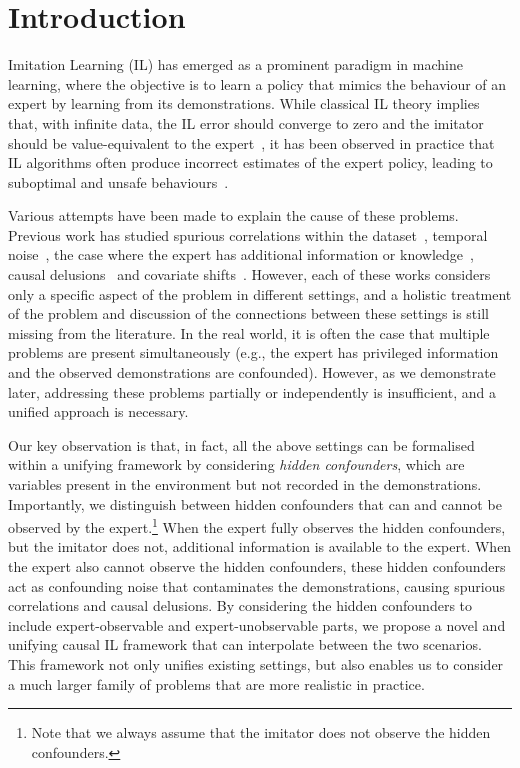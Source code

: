\section{Introduction}\label{sec:intro}
Imitation Learning (IL) has emerged as a prominent paradigm in machine learning, where the objective is to learn a policy that mimics the behaviour of an expert by learning from its demonstrations. While classical IL theory implies that, with infinite data, the IL error should converge to zero and the imitator should be value-equivalent to the expert~\citep{Ross2011,Spencer2021}, it has been observed in practice that IL algorithms often produce incorrect estimates of the expert policy, leading to suboptimal and unsafe behaviours~\citep{Lecun2005,Codevilla2019,Bansal2018,Kuefler2017}. 

Various attempts have been made to explain the cause of these problems. Previous work has studied spurious correlations within the dataset~\citep{deHaan2019,Codevilla2019,Pfrommer2023}, temporal noise~\citep{Swamy2022_temporal}, the case where the expert has additional information or knowledge~\citep{Swamy2022,Vuorio2022,Chen2019,Choudhury2017}, causal delusions~\citep{Ortega2008,Ortega2021} and covariate shifts~\citep{Spencer2021}. 
However, each of these works considers only a specific aspect of the problem in different settings, and a holistic treatment of the problem and discussion of the connections between these settings is still missing from the literature. 
In the real world, it is often the case that multiple problems are present simultaneously (e.g., the expert has privileged information and the observed demonstrations are confounded). However, as we demonstrate later, addressing these problems partially or independently is insufficient, and a unified approach is necessary. 

Our key observation is that, in fact, all the above settings can be formalised within a unifying framework by considering \textit{hidden confounders}, which are variables present in the environment but not recorded in the demonstrations. Importantly, we distinguish between hidden confounders that can and cannot be observed by the expert.\footnote{Note that we always assume that the imitator does not observe the hidden confounders.} 
When the expert fully observes the hidden confounders, but the imitator does not, additional information is available to the expert. When the expert also cannot observe the hidden confounders, these hidden confounders act as confounding noise that contaminates the demonstrations, 
causing spurious correlations and causal delusions. By considering the hidden confounders to include expert-observable and expert-unobservable parts, we propose a novel and unifying causal IL framework that can interpolate between the two scenarios. This framework not only unifies existing settings, but also enables us to consider a much larger family of problems that are more realistic in practice.


